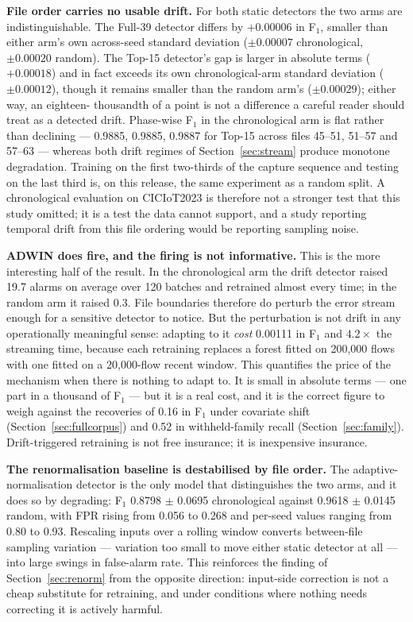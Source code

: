 \documentclass[11pt,a4paper]{article}
\begin{document}
\textbf{File order carries no usable drift.} For both static detectors the two
arms are indistinguishable. The Full-39 detector differs by $+0.00006$ in
F$_1$, smaller than either arm's own across-seed standard deviation
($\pm 0.00007$ chronological, $\pm 0.00020$ random). The Top-15 detector's gap
is larger in absolute terms ($+0.00018$) and in fact exceeds its own
chronological-arm standard deviation ($\pm 0.00012$), though it remains
smaller than the random arm's ($\pm 0.00029$); either way, an eighteen-
thousandth of a point is not a difference a careful reader should treat as a
detected drift. Phase-wise F$_1$ in the
chronological arm is flat rather than declining --- 0.9885, 0.9885, 0.9887 for
Top-15 across files 45--51, 51--57 and 57--63 --- whereas both drift regimes of
Section~\ref{sec:stream} produce monotone degradation. Training on the first
two-thirds of the capture sequence and testing on the last third is, on this
release, the same experiment as a random split. A chronological evaluation on
CICIoT2023 is therefore not a stronger test that this study omitted; it is a
test the data cannot support, and a study reporting temporal drift from this
file ordering would be reporting sampling noise.

\textbf{ADWIN does fire, and the firing is not informative.} This is the more
interesting half of the result. In the chronological arm the drift detector
raised 19.7 alarms on average over 120 batches and retrained almost every
time; in the random arm it raised 0.3. File boundaries therefore do perturb the
error stream enough for a sensitive detector to notice. But the perturbation
is not drift in any operationally meaningful sense: adapting to it \emph{cost}
0.00111 in F$_1$ and $4.2\times$ the streaming time, because each retraining
replaces a forest fitted on 200{,}000 flows with one fitted on a 20{,}000-flow
recent window. This quantifies the price of the mechanism when there is
nothing to adapt to. It is small in absolute terms --- one part in a thousand
of F$_1$ --- but it is a real cost, and it is the correct figure to weigh
against the recoveries of 0.16 in F$_1$ under covariate shift
(Section~\ref{sec:fullcorpus}) and 0.52 in withheld-family recall
(Section~\ref{sec:family}). Drift-triggered retraining is not free
insurance; it is inexpensive insurance.

\textbf{The renormalisation baseline is destabilised by file order.} The
adaptive-normalisation detector is the only model that distinguishes the two
arms, and it does so by degrading: F$_1$ 0.8798 $\pm$ 0.0695 chronological
against 0.9618 $\pm$ 0.0145 random, with FPR rising from 0.056 to 0.268 and
per-seed values ranging from 0.80 to 0.93. Rescaling inputs over a rolling
window converts between-file sampling variation --- variation too small to move
either static detector at all --- into large swings in false-alarm rate. This
reinforces the finding of Section~\ref{sec:renorm} from the opposite
direction: input-side correction is not a cheap substitute for retraining, and
under conditions where nothing needs correcting it is actively harmful.
\end{document}
